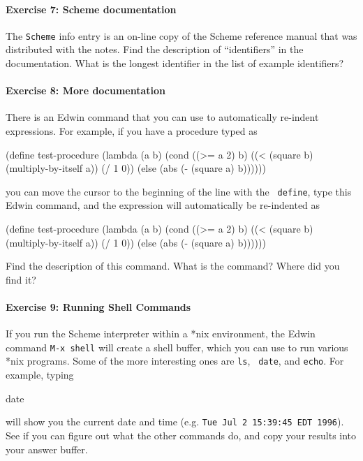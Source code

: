 \paragraph{Exercise 7: Scheme documentation}

The {\tt Scheme} info entry is an on-line copy of the Scheme
reference manual that was distributed with the notes.  Find the
description of ``identifiers'' in the documentation.  What is the
longest identifier in the list of example identifiers?

\paragraph{Exercise 8: More documentation}

There is an Edwin command that you can use to automatically re-indent
expressions.  For example, if you have a procedure typed as

\beginlisp
(define test-procedure
(lambda (a b)
(cond ((>= a 2) b)
   ((< (square b)
 (multiply-by-itself a))
         (/ 1 0))
(else (abs (- (square a) b))))))
\endlisp

\noindent
you can move the cursor to the beginning of the line with the {\tt
define}, type this Edwin command, and the expression will
automatically be re-indented as

\beginlisp
(define test-procedure
  (lambda (a b)
    (cond ((>= a 2) b)
          ((< (square b)
              (multiply-by-itself a))
           (/ 1 0))
          (else (abs (- (square a) b))))))
\endlisp

\noindent
Find the description of this command.  What is the command?  Where did
you find it?

\paragraph{Exercise 9: Running Shell Commands}

If you run the Scheme interpreter within a *nix environment, the Edwin command
{\tt M-x shell} will create a shell buffer, which you can use to run
various *nix programs.  Some of the more interesting ones are {\tt ls}, {\tt
date}, and {\tt echo}.
For example, typing

\beginlisp
date
\endlisp

\noindent
will show you the current date and time (e.g. {\tt Tue Jul  2 15:39:45 EDT
1996}). See if you can figure out what the other commands do, and copy your
results into your answer buffer.

